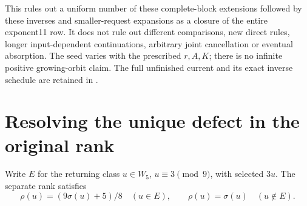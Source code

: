 \documentclass[11pt]{article}
\begin{document}
This rules out a uniform number of these complete-block extensions
followed by these inverses and smaller-request expansions as a closure
of the entire exponent11 row. It does not rule out different comparisons,
new direct rules, longer input-dependent continuations, arbitrary joint
cancellation or eventual absorption. The seed varies with the prescribed
$r,A,K$; there is no infinite positive growing-orbit claim.
The full unfinished current and its exact inverse schedule are retained in
.

\section{Resolving the unique defect in the original rank}
Write $E$ for the returning class $u\in W_5$, $u\equiv3\pmod9$,
with selected $3u$. The separate rank satisfies
\[
 \rho(u)=(9\sigma(u)+5)/8\quad(u\in E),\qquad
 \rho(u)=\sigma(u)\quad(u\notin E).
\]
\end{document}
